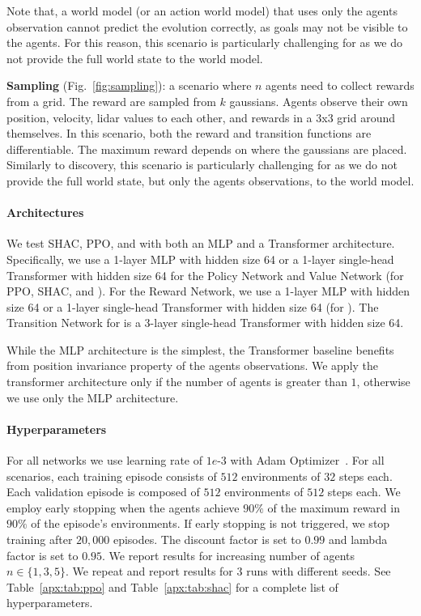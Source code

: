 \begin{compactitem}
         Note that, a world model (or an action world model) that uses only the agents observation cannot predict the evolution correctly, as goals may not be visible to the agents. For this reason, this scenario is particularly challenging for \fname{} as we do not provide the full world state to the world model.
     \item \textbf{Sampling} (Fig.~\ref{fig:sampling}): 
         a scenario where $n$ agents need to collect rewards from a grid. The reward are sampled from $k$ gaussians. Agents observe their own position, velocity, lidar values to each other, and rewards in a 3x3 grid around themselves.  
         In this scenario, both the reward and transition functions are differentiable. 
         The maximum reward depends on where the gaussians are placed.
         Similarly to discovery, this scenario is particularly challenging for \fname{} as we do not provide the full world state, but only the agents observations, to the world model.
\end{compactitem}

\paragraph{Architectures}
We test SHAC, PPO, and \fname{} with both an MLP and a Transformer architecture. Specifically, we use a 1-layer MLP with hidden size 64 or a 1-layer single-head Transformer with hidden size 64 for the Policy Network and Value Network (for PPO, SHAC, and \fname{}). For the Reward Network, we use a 1-layer MLP with hidden size 64 or a 1-layer single-head Transformer with hidden size 64 (for \fname{}). The Transition Network for \fname{} is a 3-layer single-head Transformer with hidden size 64.

While the MLP architecture is the simplest, the Transformer baseline benefits from position invariance property of the agents observations. We apply the transformer architecture only if the number of agents is greater than $1$, otherwise we use only the MLP architecture. 

\paragraph{Hyperparameters}
For all networks we use learning rate of $1e\text{-}3$ with Adam Optimizer~\cite{Kingma14}. For all scenarios, each training episode consists of $512$ environments of $32$ steps each. Each validation episode is composed of $512$ environments of $512$ steps each. We employ early stopping when the agents achieve $90\%$ of the maximum reward in $90\%$ of the episode's environments. If early stopping is not triggered, we stop training after $20,000$ episodes. The discount factor is set to $0.99$ and lambda factor is set to $0.95$. We report results for increasing number of agents $n\in\{1,3,5\}$. We repeat and report results for $3$ runs with different seeds. See Table~\ref{apx:tab:ppo} and Table~\ref{apx:tab:shac} for a complete list of hyperparameters.

